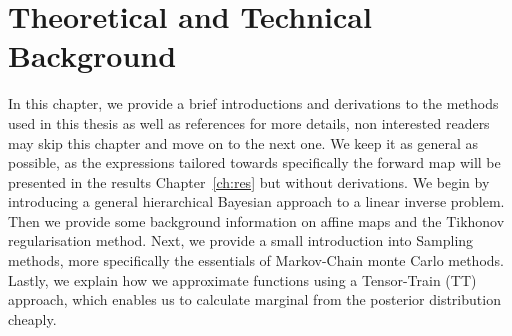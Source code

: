 \the\columnwidth
\chapter{Theoretical and Technical Background}
\label{ch:background}
In this chapter, we provide a brief introductions and derivations to the methods used in this thesis as well as references for more details, non interested readers may skip this chapter and move on to the next one. We keep it as general as possible, as the expressions tailored towards specifically the forward map will be presented in the results Chapter~\ref{ch:res} but without derivations.
We begin by introducing a general hierarchical Bayesian approach to a linear inverse problem.
Then we provide some background information on affine maps and the Tikhonov regularisation method.
Next, we provide a small introduction into Sampling methods, more specifically the essentials of Markov-Chain monte Carlo methods.
Lastly, we explain how we approximate functions using a Tensor-Train (TT) approach, which enables us to calculate marginal from the posterior distribution cheaply.








